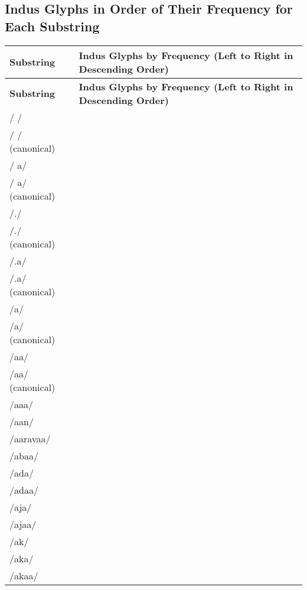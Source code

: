 \documentclass{article}
\begin{document}
\begin{center}
\section*{Indus Glyphs in Order of Their Frequency for Each Substring}
\end{center}
\begin{longtable}{|l|p{}|}
\hline
\textbf{Substring} & \textbf{Indus Glyphs by Frequency (Left to Right in Descending Order)} \\
\hline
\endfirsthead
\hline
\textbf{Substring} & \textbf{Indus Glyphs by Frequency (Left to Right in Descending Order)} \\
\hline
\endhead
\hline
\endfoot
\hline
\endlastfoot
/ / & \textIndus{} \\ \hline
/ / (canonical) & \textIndus{} \\ \hline
/ a/ & \textIndus{} \\ \hline
/ a/ (canonical) & \textIndus{} \\ \hline
/./ & \textIndus{} \\ \hline
/./ (canonical) & \textIndus{} \\ \hline
/.a/ & \textIndus{} \\ \hline
/.a/ (canonical) & \textIndus{} \\ \hline
/a/ & \textIndus{} \\ \hline
/a/ (canonical) & \textIndus{} \\ \hline
/aa/ & \textIndus{} \\ \hline
/aa/ (canonical) & \textIndus{} \\ \hline
/aaa/ & \textIndus{} \\ \hline
/aan/ & \textIndus{} \\ \hline
/aaravaa/ & \textIndus{} \\ \hline
/abaa/ & \textIndus{} \\ \hline
/ada/ & \textIndus{} \\ \hline
/adaa/ & \textIndus{} \\ \hline
/aja/ & \textIndus{} \\ \hline
/ajaa/ & \textIndus{} \\ \hline
/ak/ & \textIndus{} \\ \hline
/aka/ & \textIndus{} \\ \hline
/akaa/ & \textIndus{} \\ \hline

\end{longtable}
\end{document}
